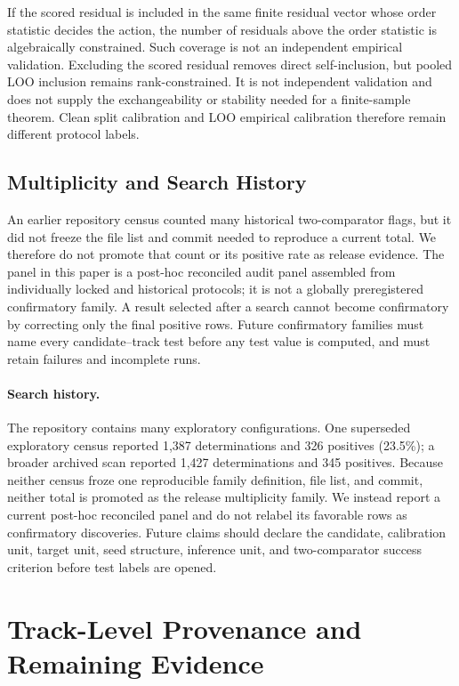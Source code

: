 If the scored residual is included in the same finite residual vector whose order statistic decides
the action, the number of residuals above the order statistic is algebraically constrained. Such
coverage is not an independent empirical validation. Excluding the scored residual removes direct
self-inclusion, but pooled LOO inclusion remains rank-constrained. It is not independent validation
and does not supply the exchangeability or stability needed for a finite-sample theorem. Clean
split calibration and LOO empirical calibration therefore remain different protocol labels.

\subsection{Multiplicity and Search History}

An earlier repository census counted many historical two-comparator flags, but it did not freeze the
file list and commit needed to reproduce a current total. We therefore do not promote that count or
its positive rate as release evidence. The panel in this paper is a post-hoc reconciled audit panel
assembled from individually locked and historical protocols; it is not a globally preregistered
confirmatory family. A result selected after a search cannot become confirmatory by correcting only
the final positive rows. Future confirmatory families must name every candidate--track test before
any test value is computed, and must retain failures and incomplete runs.

\paragraph{Search history.}
The repository contains many exploratory configurations. One superseded exploratory census reported
1,387 determinations and 326 positives (23.5\%); a broader archived scan reported 1,427
determinations and 345 positives. Because neither census froze one reproducible family definition,
file list, and commit, neither total is promoted as the release
multiplicity family. We instead report a current post-hoc reconciled panel and do not relabel its
favorable rows as confirmatory discoveries. Future claims should declare the candidate, calibration
unit, target unit, seed structure, inference unit, and two-comparator success criterion before test
labels are opened.

\section{Track-Level Provenance and Remaining Evidence}
\label{app:compact-provenance}

